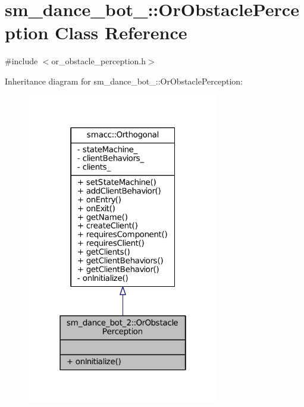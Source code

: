 \hypertarget{classsm__dance__bot__2_1_1OrObstaclePerception}{}\section{sm\+\_\+dance\+\_\+bot\+\_\+:\+:Or\+Obstacle\+Perception Class Reference}
\label{classsm__dance__bot__2_1_1OrObstaclePerception}


{\ttfamily \#include $<$or\+\_\+obstacle\+\_\+perception.\+h$>$}



Inheritance diagram for sm\+\_\+dance\+\_\+bot\+\_\+:\+:Or\+Obstacle\+Perception\+:
\nopagebreak
\begin{figure}[H]
\begin{center}
\leavevmode
\includegraphics[width=238pt]{classsm__dance__bot__2_1_1OrObstaclePerception__inherit__graph}
\end{center}
\end{figure}


